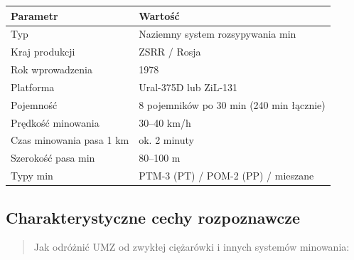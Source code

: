 \documentclass[12pt,oneside]{book}
\begin{document}
\begin{longtable}[]{@{}ll@{}}
\toprule\noalign{}
Parametr & Wartość \\
\midrule\noalign{}
\endhead
\bottomrule\noalign{}
\endlastfoot
Typ & Naziemny system rozsypywania min \\
Kraj produkcji & ZSRR / Rosja \\
Rok wprowadzenia & 1978 \\
Platforma & Ural-375D lub ZiL-131 \\
Pojemność & 8 pojemników po 30 min (240 min łącznie) \\
Prędkość minowania & 30--40 km/h \\
Czas minowania pasa 1 km & ok. 2 minuty \\
Szerokość pasa min & 80--100 m \\
Typy min & PTM-3 (PT) / POM-2 (PP) / mieszane \\
\end{longtable}

\subsection{Charakterystyczne cechy
rozpoznawcze}\label{charakterystyczne-cechy-rozpoznawcze-133}

\begin{quote}
Jak odróżnić UMZ od zwykłej ciężarówki i innych systemów minowania:
\end{quote}
\end{document}
